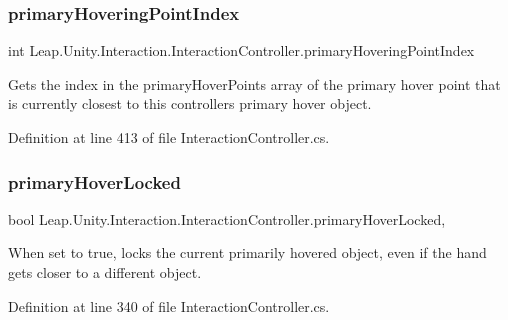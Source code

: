 \subsubsection{\texorpdfstring{primaryHoveringPointIndex}{primaryHoveringPointIndex}}
{\footnotesize\ttfamily int Leap.\+Unity.\+Interaction.\+Interaction\+Controller.\+primary\+Hovering\+Point\+Index\hspace{0.3cm}{\ttfamily [get]}}



Gets the index in the primary\+Hover\+Points array of the primary hover point that is currently closest to this controller\textquotesingle{}s primary hover object. 



Definition at line 413 of file Interaction\+Controller.\+cs.

\mbox{\label{class_leap_1_1_unity_1_1_interaction_1_1_interaction_controller_afa44de31d034ff2bceb41ee6a20d0253}} 
\subsubsection{\texorpdfstring{primaryHoverLocked}{primaryHoverLocked}}
{\footnotesize\ttfamily bool Leap.\+Unity.\+Interaction.\+Interaction\+Controller.\+primary\+Hover\+Locked\hspace{0.3cm}{\ttfamily [get]}, {\ttfamily [set]}}



When set to true, locks the current primarily hovered object, even if the hand gets closer to a different object. 



Definition at line 340 of file Interaction\+Controller.\+cs.

\mbox{\label{class_leap_1_1_unity_1_1_interaction_1_1_interaction_controller_a4ac00d9dac22e9a958b3bbff49fffdc1}} 
